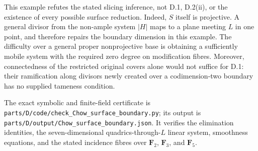 \begin{remark}
This example refutes the stated slicing inference, not D.1,
D.2(ii), or the existence of every possible surface reduction.
Indeed, $S$ itself is projective.  A general divisor from the
non-ample system $|H|$ maps to a plane meeting $L$ in one
point, and therefore repairs the boundary dimension in this
example.  The difficulty over a general proper nonprojective
base is obtaining a sufficiently mobile system with the
required zero degree on modification fibres.  Moreover,
connectedness of the restricted original covers alone would
not suffice for D.1: their ramification along divisors newly
created over a codimension-two boundary has no supplied
tameness condition.

The exact symbolic and finite-field certificate is
\nolinkurl{parts/D/code/check_Chow_surface_boundary.py}; its
output is
\nolinkurl{parts/D/output/Chow_surface_boundary.json}.
It verifies the elimination identities, the seven-dimensional
quadrics-through-$L$ linear system, smoothness equations,
and the stated incidence fibres over $\mathbf F_2$,
$\mathbf F_3$, and $\mathbf F_5$.
\end{remark}
